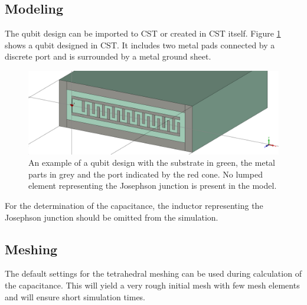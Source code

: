 \subsection{Modeling}
The qubit design can be imported to CST or created in CST itself. Figure \ref{fig:capacitance_basic_setup} shows a qubit designed in CST. It includes two metal pads connected by a discrete port and is surrounded by a metal ground sheet. 
\begin{figure}
	\includegraphics[width=\textwidth]{Figures/capacitance_basic_setup}
	\caption{An example of a qubit design with the substrate in green, the metal parts in grey and the port indicated by the red cone. No lumped element representing the Josephson junction is present in the model.}
	\label{fig:capacitance_basic_setup}
\end{figure}
For the determination of the capacitance, the inductor representing the Josephson junction should be omitted from the simulation.
\subsection{Meshing}
The default settings for the tetrahedral meshing can be used during calculation of the capacitance. This will yield a very rough initial mesh with few mesh elements and will ensure short simulation times.
